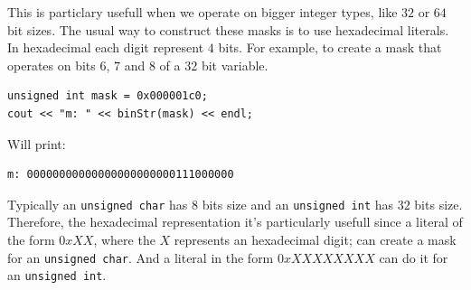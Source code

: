 This is particlary usefull when we operate on bigger integer types, like $32$ or $64$ bit sizes.
The usual way to construct these masks is to use hexadecimal literals.
In hexadecimal each digit represent $4$ bits.
For example, to create a mask that operates on bits $6$, $7$ and $8$ of a $32$ bit variable. 

\begin{verbatim}
unsigned int mask = 0x000001c0;
cout << "m: " << binStr(mask) << endl;
\end{verbatim}

Will print:
\begin{verbatim}
m: 00000000000000000000000111000000
\end{verbatim}

Typically an \texttt{unsigned char} has $8$ bits size and an \texttt{unsigned int} has $32$ bits size.
Therefore, the hexadecimal representation it's particularly usefull since a literal of the form $0xXX$, where the $X$ represents an hexadecimal digit; can create a mask for an \texttt{unsigned char}.
And a literal in the form $0xXXXXXXXX$ can do it for an \texttt{unsigned int}.
